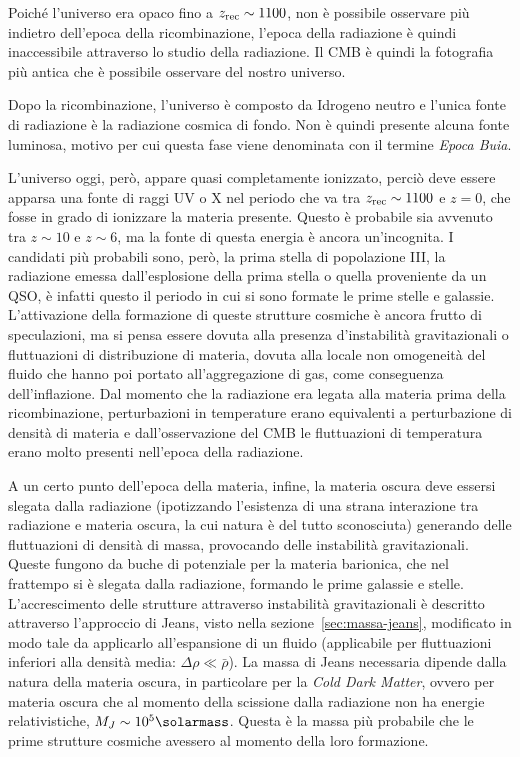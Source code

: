 Poiché l'universo era opaco fino a $z_\textup{rec} \sim 1100$, non è possibile osservare più indietro dell'epoca della ricombinazione, l'epoca della radiazione è quindi inaccessibile attraverso lo studio della radiazione. Il CMB è quindi la fotografia più antica che è possibile osservare del nostro universo.

Dopo la ricombinazione, l'universo è composto da Idrogeno neutro e l'unica fonte di radiazione è la radiazione cosmica di fondo. Non è quindi presente alcuna fonte luminosa, motivo per cui questa fase viene denominata con il termine \emph{Epoca Buia}.

L'universo oggi, però, appare quasi completamente ionizzato, perciò deve essere apparsa una fonte di raggi UV o X nel periodo che va tra $z_\textup{rec} \sim 1100$ e $z = 0$, che fosse in grado di ionizzare la materia presente. Questo è probabile sia avvenuto tra $z \sim 10$ e $z \sim 6$, ma la fonte di questa energia è ancora un'incognita. I candidati più probabili sono, però, la prima stella di popolazione III, la radiazione emessa dall'esplosione della prima stella o quella proveniente da un QSO, è infatti questo il periodo in cui si sono formate le prime stelle e galassie. L'attivazione della formazione di queste strutture cosmiche è ancora frutto di speculazioni, ma si pensa essere dovuta alla presenza d'instabilità gravitazionali o fluttuazioni di distribuzione di materia, dovuta alla locale non omogeneità del fluido che hanno poi portato all'aggregazione di gas, come conseguenza dell'inflazione. Dal momento che la radiazione era legata alla materia prima della ricombinazione, perturbazioni in temperature erano equivalenti a perturbazione di densità di materia e dall'osservazione del CMB le fluttuazioni di temperatura erano molto presenti nell'epoca della radiazione.

A un certo punto dell'epoca della materia, infine, la materia oscura deve essersi slegata dalla radiazione (ipotizzando l'esistenza di una strana interazione tra radiazione e materia oscura, la cui natura è del tutto sconosciuta) generando delle fluttuazioni di densità di massa, provocando delle instabilità gravitazionali. Queste fungono da buche di potenziale per la materia barionica, che nel frattempo si è slegata dalla radiazione, formando le prime galassie e stelle. L'accrescimento delle strutture attraverso instabilità gravitazionali è descritto attraverso l'approccio di Jeans, visto nella sezione~\ref{sec:massa-jeans}, modificato in modo tale da applicarlo all'espansione di un fluido (applicabile per fluttuazioni inferiori alla densità media: $\Delta \rho \ll \bar{\rho}$). La massa di Jeans necessaria dipende dalla natura della materia oscura, in particolare per la \emph{Cold Dark Matter}, ovvero per materia oscura che al momento della scissione dalla radiazione non ha energie relativistiche, $M_J \sim 10^5 \si{\solarmass}$. Questa è la massa più probabile che le prime strutture cosmiche avessero al momento della loro formazione.


